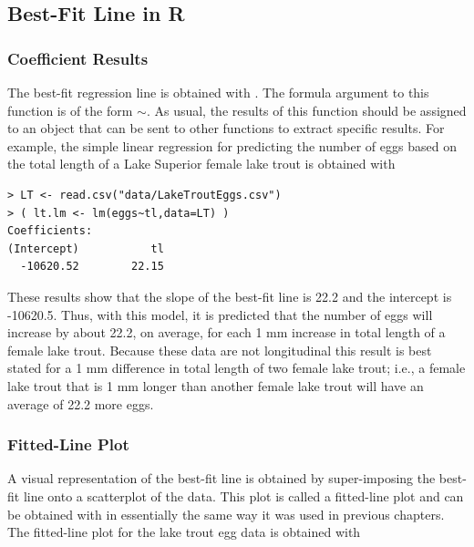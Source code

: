\documentclass[10pt,openany]{book}\usepackage[]{graphicx}\usepackage[]{color}
\makeatletter
\newenvironment{kframe}{%
 \def\at@end@of@kframe{}%
 \ifinner\ifhmode%
  \def\at@end@of@kframe{\end{minipage}}%
  \begin{minipage}{\columnwidth}%
 \fi\fi%
 \def\FrameCommand##1{\hskip\@totalleftmargin \hskip-\fboxsep
 \colorbox{shadecolor}{##1}\hskip-\fboxsep
     \hskip-\linewidth \hskip-\@totalleftmargin \hskip\columnwidth}%
 \MakeFramed {\advance\hsize-\width
   \@totalleftmargin\z@ \linewidth\hsize
   \@setminipage}}%
 {\par\unskip\endMakeFramed%
 \at@end@of@kframe}
\newenvironment{knitrout}{}{} %
\makeatother
\begin{document}
\subsection{Best-Fit Line in R}
\subsubsection*{Coefficient Results}
The best-fit regression line is obtained with .  The formula argument to this function is of the form $\sim$.  As usual, the results of this function should be assigned to an object that can be sent to other functions to extract specific results.  For example, the simple linear regression for predicting the number of eggs based on the total length of a Lake Superior female lake trout is obtained with

\begin{knitrout}
\color{fgcolor}\begin{kframe}
\begin{verbatim}
> LT <- read.csv("data/LakeTroutEggs.csv")
> ( lt.lm <- lm(eggs~tl,data=LT) )
Coefficients:
(Intercept)           tl  
  -10620.52        22.15  
\end{verbatim}
\end{kframe}
\end{knitrout}

These results show that the slope of the best-fit line is 22.2 and the intercept is -10620.5.  Thus, with this model, it is predicted that the number of eggs will increase by about 22.2, on average, for each 1 mm increase in total length of a female lake trout.  Because these data are not longitudinal this result is best stated for a 1 mm difference in total length of two female lake trout; i.e., a female lake trout that is 1 mm longer than another female lake trout will have an average of 22.2 more eggs.

\subsubsection*{Fitted-Line Plot}
A visual representation of the best-fit line is obtained by super-imposing the best-fit line onto a scatterplot of the data.  This plot is called a fitted-line plot and can be obtained with  in essentially the same way it was used in previous chapters.  The fitted-line plot for the lake trout egg data  is obtained with
\end{document}
